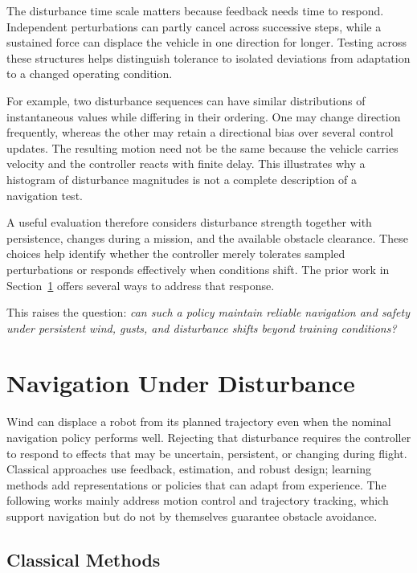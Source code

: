 The disturbance time scale matters because feedback needs time to respond. Independent perturbations can partly cancel across successive steps, while a sustained force can displace the vehicle in one direction for longer. Testing across these structures helps distinguish tolerance to isolated deviations from adaptation to a changed operating condition.

For example, two disturbance sequences can have similar distributions of instantaneous values while differing in their ordering. One may change direction frequently, whereas the other may retain a directional bias over several control updates. The resulting motion need not be the same because the vehicle carries velocity and the controller reacts with finite delay. This illustrates why a histogram of disturbance magnitudes is not a complete description of a navigation test.

A useful evaluation therefore considers disturbance strength together with persistence, changes during a mission, and the available obstacle clearance. These choices help identify whether the controller merely tolerates sampled perturbations or responds effectively when conditions shift. The prior work in Section~\ref{ch:disturbanceprior} offers several ways to address that response.

This raises the question: \emph{can such a policy maintain reliable navigation and safety under persistent wind, gusts, and disturbance shifts beyond training conditions?}

\FloatBarrier
\section{Navigation Under Disturbance}
\label{ch:disturbanceprior}

Wind can displace a robot from its planned trajectory even when the nominal navigation policy performs well. Rejecting that disturbance requires the controller to respond to effects that may be uncertain, persistent, or changing during flight. Classical approaches use feedback, estimation, and robust design; learning methods add representations or policies that can adapt from experience. The following works mainly address motion control and trajectory tracking, which support navigation but do not by themselves guarantee obstacle avoidance.

\subsection{Classical Methods}

